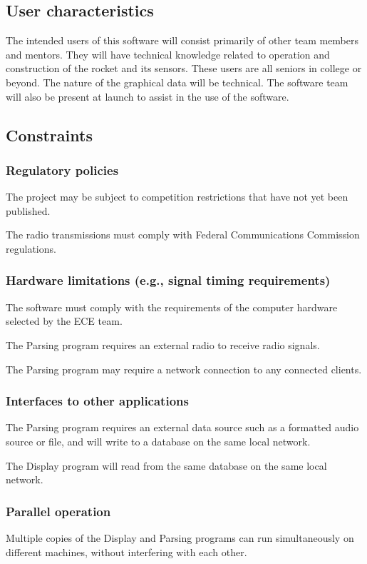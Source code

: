 \documentclass[onecolumn, draftclsnofoot, 10pt, compsoc]{IEEEtran}
\begin{document}
\subsection{User characteristics}
The intended users of this software will consist primarily of other team members and mentors. They will have technical knowledge related to operation and construction of the rocket and its sensors. These users are all seniors in college or beyond. The nature of the graphical data will be technical. The software team will also be present at launch to assist in the use of the software.

\subsection{Constraints}
\subsubsection{Regulatory policies}
The project may be subject to competition restrictions that have not yet been published.

The radio transmissions must comply with Federal Communications Commission regulations.

\subsubsection{Hardware limitations (e.g., signal timing requirements)}
The software must comply with the requirements of the computer hardware selected by the ECE team.

The Parsing program requires an external radio to receive radio signals.

The Parsing program may require a network connection to any connected clients.

\subsubsection{Interfaces to other applications}
The Parsing program requires an external data source such as a formatted audio source or file, and will write to a database on the same local network.

The Display program will read from the same database on the same local network.

\subsubsection{Parallel operation}
Multiple copies of the Display and Parsing programs can run simultaneously on different machines, without interfering with each other.
\end{document}
